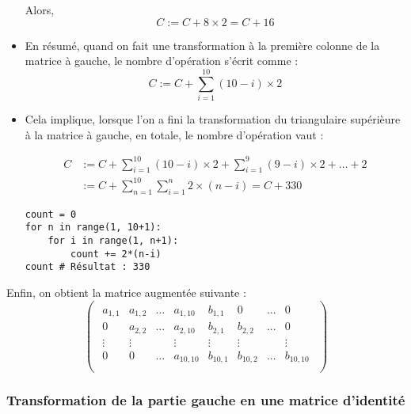 \documentclass{article}
\begin{document}
\begin{itemize}
Alors, \[
C := C + 8 \times 2 = C + 16
\]

\item En résumé, quand on fait une transformation à la première colonne de la matrice à gauche, le nombre d'opération s'écrit comme :
    \[
    C := C + \sum_{i=1}^{10} (10-i) \times  2
    \]
\item Cela implique, lorsque l'on a fini la transformation du triangulaire supérièure à la matrice à gauche, en totale, le nombre d'opération vaut :
    \begin{tcolorbox}
    \begin{align*}
        C &:= C + \sum_{i=1}^{10} (10-i) \times  2 + \sum_{i=1}^{9} (9-i) \times  2 + \ldots + 2 \\
          &:= C + \sum_{n=1}^{10} \sum_{i=1}^{n} 2 \times (n-i) = C + 330
    \end{align*}
        
    \end{tcolorbox}

\begin{lstlisting}
count = 0
for n in range(1, 10+1):
    for i in range(1, n+1):
        count += 2*(n-i)
count # Résultat : 330
\end{lstlisting}

\end{itemize}

Enfin, on obtient la matrice augmentée suivante :
\[
\begin{pmatrix}
\begin{array}{cccc|cccc}
a_{1,1} & a_{1,2} & ... & a_{1,10} & b_{1,1} &0&... &0\\
0 & a_{2,2} & ... & a_{2,10} & b_{2,1} &b_{2,2} & ...&0\\
\vdots & \vdots & & \vdots & \vdots &\vdots & &\vdots\\
0 & 0 & ... & a_{10,10} & b_{10,1}& b_{10,2}&... & b_{10,10}\\
\end{array}
\end{pmatrix}
\]

\subsubsection{Transformation de la partie gauche en une matrice d'identité}
\end{document}
